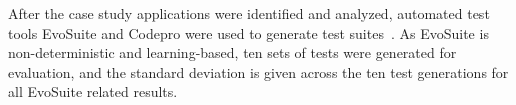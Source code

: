 \begin{table}[!t]
\caption{Benchmark Programs and their Properties}
\label{tbl:program_table}
\end{table}

After the case study applications were identified and analyzed, automated test tools EvoSuite and Codepro were used to generate test suites~\cite{CodePro1, fraser:2011:eat:2025113.2025179}. As EvoSuite is non-deterministic and learning-based, ten sets of tests were generated for evaluation, and the standard deviation is given across the ten test generations for all EvoSuite related results.  

